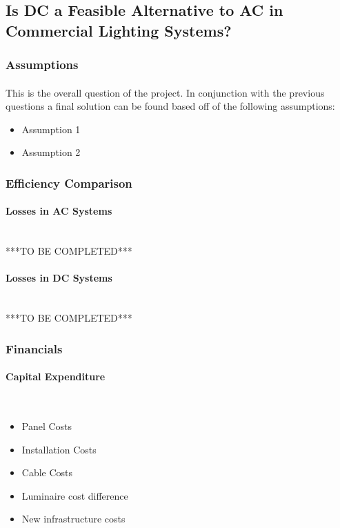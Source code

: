 \subsection{Is DC a Feasible Alternative to AC in Commercial Lighting Systems?}

\subsubsection{Assumptions}
\paragraph{}
This is the overall question of the project. In conjunction with the previous questions a final solution can be found based off of the following assumptions:

\begin{itemize}[noitemsep,nolistsep]
	\item Assumption 1
	\item Assumption 2
\end{itemize}

\subsubsection{Efficiency Comparison}

\paragraph{Losses in AC Systems}
~\\
***TO BE COMPLETED***

\paragraph{Losses in DC Systems}
~\\
***TO BE COMPLETED***

\subsubsection{Financials}

\paragraph{Capital Expenditure}
~\\
\begin{itemize}[noitemsep,nolistsep]
	\item Panel Costs
	\item Installation Costs
	\item Cable Costs
	\item Luminaire cost difference
	\item New infrastructure costs
\end{itemize}

